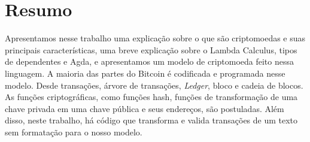 \section{Resumo}

Apresentamos nesse trabalho uma explicação sobre o que são criptomoedas e suas principais características,
uma breve explicação sobre o Lambda Calculus, tipos de dependentes e Agda,
e apresentamos um modelo de criptomoeda feito nessa linguagem.
A maioria das partes do Bitcoin é codificada e programada nesse modelo.
Desde transações, árvore de transações, \emph{Ledger}, bloco e cadeia de blocos.
As funções criptográficas, como funções hash,
funções de transformação de uma chave privada em uma chave pública e seus endereços,
são postuladas.
Além disso, neste trabalho, há código que transforma e valida transações
de um texto sem formatação para o nosso modelo.
